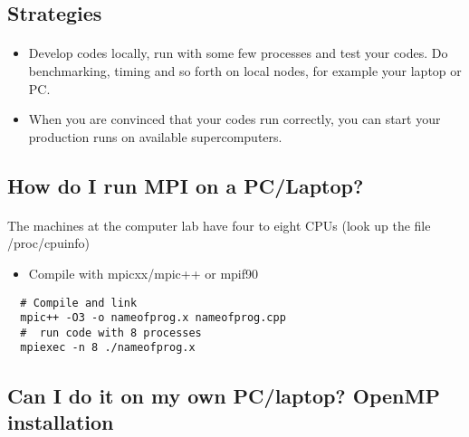 \documentclass[%
oneside,                 %
final,                   %
10pt]{article}
\begin{document}
\subsection*{Strategies}

\paragraph{}
\begin{itemize}
\item Develop codes locally, run with some few processes and test your codes.  Do benchmarking, timing and so forth on local nodes, for example your laptop or PC. 

\item When you are convinced that your codes run correctly, you can start your production runs on available supercomputers.
\end{itemize}

\noindent



\subsection*{How do I run MPI on a PC/Laptop?}

\paragraph{}
The  machines at the computer lab have four to eight CPUs (look up the file /proc/cpuinfo)
\begin{itemize}
\item Compile with mpicxx/mpic++ or mpif90
\end{itemize}

\noindent
\begin{verbatim}
  # Compile and link
  mpic++ -O3 -o nameofprog.x nameofprog.cpp
  #  run code with 8 processes
  mpiexec -n 8 ./nameofprog.x
\end{verbatim}



\subsection*{Can I do it on my own PC/laptop? OpenMP installation}
\end{document}
